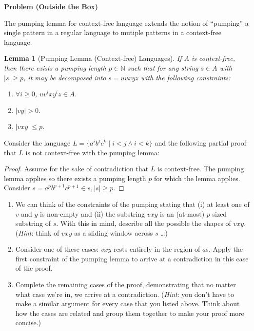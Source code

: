 \documentclass[12pt]{article}
\newtheorem{lemma}{Lemma}
\newcounter{ProblemCounter}
\newenvironment{problem}[1][]
  {\refstepcounter{ProblemCounter}\noindent\textbf{Problem \theProblemCounter{} (#1)}\quad}
  {\newpage}
\begin{document}

\begin{problem}[Outside the Box]

The pumping lemma for context-free language extends the notion of ``pumping'' a
single pattern in a regular language to mutiple patterns in a context-free
language.

\begin{lemma}[Pumping Lemma (Context-free) Languages]
  If \( A \) is context-free, then there exists a pumping length \( p \in
  \mathbb{N} \) such that for any string \( s \in A \) with \( |s| \geq p \),
  it may be decomposed into \( s = uvxyz \) with the following constraints:
  \begin{enumerate}
    \item \( \forall i \geq 0 \), \( uv^{i}xy^{i}z \in A \).
    \item \( |vy| > 0 \).
    \item \( |vxy| \leq p \).
  \end{enumerate}
\end{lemma}
Consider the language \( L = \{ a^i b^j c^k \mid i < j \wedge i < k \} \) and the
following partial proof that \( L \) is not context-free with the pumping
lemma:
\begin{proof}
  Assume for the sake of contradiction that \( L \) is context-free.  The pumping
  lemma applies so there exists a pumping length \( p \) for which the lemma
  applies.  Consider \( s = a^{p} b^{p+1} c^{p+1} \in s, |s| \geq p \).
\end{proof}

\begin{enumerate}[label=(\alph*)]
  \item We can think of the constraints of the pumping stating that (i) at
    least one of \( v \) and \( y \) is non-empty and (ii) the substring \( vxy
    \) is an (at-most) \( p \) sized substring of \( s \).  With this in mind,
    describe all the possible the shapes of \( vxy \).  (\emph{Hint}: think of
    \( vxy \) as a sliding window across \( s \) \ldots)
  \item Consider one of these cases: \( vxy \) rests entirely in the region of
    \( a \)s. Apply the first constraint of the pumping lemma to arrive at a
    contradiction in this case of the proof.
  \item Complete the remaining cases of the proof, demonstrating that no matter
    what case we're in, we arrive at a contradiction. (\emph{Hint}: you don't
    have to make a similar argument for every case that you listed above.
    Think about how the cases are related and group them together to make your
    proof more concise.)
\end{enumerate}


\end{problem}
\end{document}
